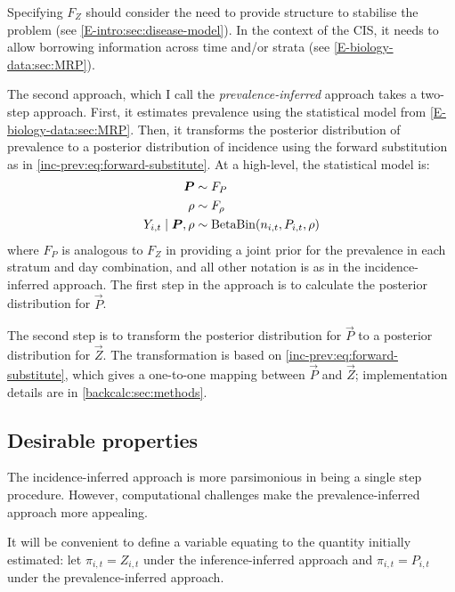 \documentclass[thesis.tex]{subfiles}
\begin{document}
Specifying $F_Z$ should consider the need to provide structure to stabilise the problem (see \cref{E-intro:sec:disease-model}).
In the context of the CIS, it needs to allow borrowing information across time and/or strata (see \cref{E-biology-data:sec:MRP}).

The second approach, which I call the \emph{prevalence-inferred} approach takes a two-step approach.
First, it estimates prevalence using the statistical model from \cref{E-biology-data:sec:MRP}.
Then, it transforms the posterior distribution of prevalence to a posterior distribution of incidence using the forward substitution as in \cref{inc-prev:eq:forward-substitute}.
At a high-level, the statistical model is:
\begin{align}
    \bm{P}  &\sim F_P \\
    \rho &\sim F_\rho \\
    Y_{i,t} \mid \bm{P}, \rho &\sim \operatorname{BetaBin}(n_{i,t}, P_{i,t}, \rho)
\end{align}
where $F_P$ is analogous to $F_Z$ in providing a joint prior for the prevalence in each stratum and day combination, and all other notation is as in the incidence-inferred approach.
The first step in the approach is to calculate the posterior distribution for $\vec{P}$.

The second step is to transform the posterior distribution for $\vec{P}$ to a posterior distribution for $\vec{Z}$.
The transformation is based on \cref{inc-prev:eq:forward-substitute}, which gives a one-to-one mapping between $\vec{P}$ and $\vec{Z}$; implementation details are in \cref{backcalc:sec:methods}.

\subsection{Desirable properties} \label{transmission:sec:backcalc-properties}

The incidence-inferred approach is more parsimonious in being a single step procedure.
However, computational challenges make the prevalence-inferred approach more appealing.

It will be convenient to define a variable equating to the quantity initially estimated: let $\pi_{i,t} = Z_{i,t}$ under the inference-inferred approach and $\pi_{i,t} = P_{i,t}$ under the prevalence-inferred approach.
\end{document}
